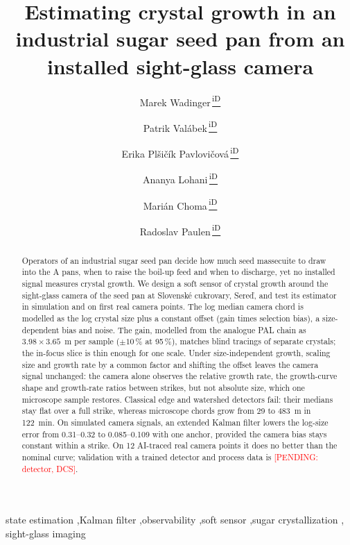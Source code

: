 \documentclass[5p,authoryear]{elsarticle}
\newcommand{\um}{\textmu m}
\newcommand{\pending}[1]{\textcolor{red}{[PENDING: #1]}}
\newcommand{\orcid}[1]{\texorpdfstring{\,\href{https://orcid.org/#1}{\textsuperscript{\textsf{iD}}}}{}}
\begin{document}
\begin{frontmatter}

\title{Estimating crystal growth in an industrial sugar seed pan from an installed sight-glass camera}

\author[STU]{Marek Wadinger\orcid{0000-0002-0167-6331}}
\author[STU]{Patrik Val\'abek\orcid{0009-0006-9201-3651}}
\author[STU]{Erika Pl\v{s}i\v{c}\'ik Pavlovi\v{c}ov\'a\orcid{0000-0003-4335-8347}}
\author[STU]{Ananya Lohani\orcid{0009-0006-8079-2475}}
\author[STU]{Mari\'an Choma\orcid{0009-0001-1956-0003}}
\author[STU]{Radoslav Paulen\orcid{0000-0002-1599-2634}}

\begin{abstract}
Operators of an industrial sugar seed pan decide how much seed massecuite to draw into the A pans, when to raise
the boil-up feed and when to discharge, yet no installed signal measures crystal growth. We design a soft sensor of
crystal growth around the sight-glass camera of the seed pan at Slovensk\'e cukrovary, Sere\v{d}, and
test its estimator in simulation and on first real camera points. The log median camera chord is modelled as the log
crystal size plus a constant offset (gain times selection bias), a size-dependent bias and noise. The gain, modelled
from the analogue PAL chain as $3.98 \times 3.65$~\um{} per sample ($\pm 10$\,\% at 95\,\%), matches blind tracings of
separate crystals; the in-focus slice is thin enough for one scale. Under
size-independent growth, scaling size and growth rate by a common factor and shifting the offset leaves the camera
signal unchanged: the camera alone observes the relative growth rate, the growth-curve shape and growth-rate
ratios between strikes, but not absolute size, which one microscope sample restores. Classical edge and watershed
detectors fail: their medians stay flat over a full strike, whereas microscope chords
grow from 29 to 483~\um{} in 122~min. On simulated camera signals, an extended Kalman filter lowers the
log-size error from 0.31--0.32 to 0.085--0.109 with one anchor, provided the camera bias stays constant within a
strike. On 12 AI-traced real camera points it does no better than
the nominal curve; validation with a trained detector and process data is \pending{detector, DCS}.
\end{abstract}


\begin{keyword}
state estimation \sep Kalman filter \sep observability \sep soft sensor \sep sugar crystallization \sep
sight-glass imaging
\end{keyword}

\end{frontmatter}
\end{document}
